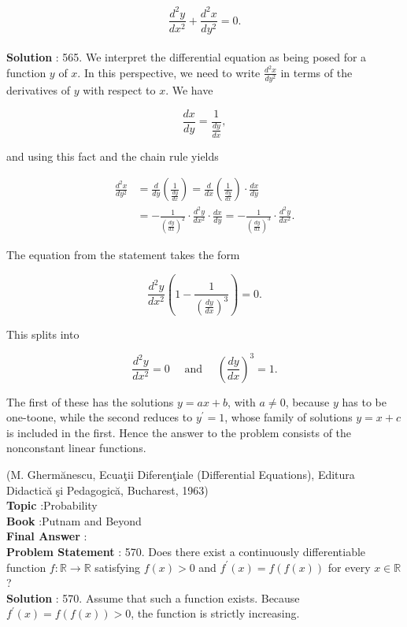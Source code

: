 \documentclass[10pt]{article}
\begin{document}
$$
\frac{d^{2} y}{d x^{2}}+\frac{d^{2} x}{d y^{2}}=0 .
$$
\\
\textbf{Solution} :
565. We interpret the differential equation as being posed for a function $y$ of $x$. In this perspective, we need to write $\frac{d^{2} x}{d y^{2}}$ in terms of the derivatives of $y$ with respect to $x$. We have

$$
\frac{d x}{d y}=\frac{1}{\frac{d y}{d x}},
$$

and using this fact and the chain rule yields

$$
\begin{aligned}
\frac{d^{2} x}{d y^{2}} &=\frac{d}{d y}\left(\frac{1}{\frac{d y}{d x}}\right)=\frac{d}{d x}\left(\frac{1}{\frac{d y}{d x}}\right) \cdot \frac{d x}{d y} \\
&=-\frac{1}{\left(\frac{d y}{d x}\right)^{2}} \cdot \frac{d^{2} y}{d x^{2}} \cdot \frac{d x}{d y}=-\frac{1}{\left(\frac{d y}{d x}\right)^{3}} \cdot \frac{d^{2} y}{d x^{2}} .
\end{aligned}
$$

The equation from the statement takes the form

$$
\frac{d^{2} y}{d x^{2}}\left(1-\frac{1}{\left(\frac{d y}{d x}\right)^{3}}\right)=0 .
$$

This splits into

$$
\frac{d^{2} y}{d x^{2}}=0 \quad \text { and } \quad\left(\frac{d y}{d x}\right)^{3}=1 .
$$

The first of these has the solutions $y=a x+b$, with $a \neq 0$, because $y$ has to be one-toone, while the second reduces to $y^{\prime}=1$, whose family of solutions $y=x+c$ is included in the first. Hence the answer to the problem consists of the nonconstant linear functions.

(M. Ghermănescu, Ecuaţii Diferenţiale (Differential Equations), Editura Didactică şi Pedagogică, Bucharest, 1963)
\\
\textbf{Topic} :Probability\\
\textbf{Book} :Putnam and Beyond\\
\textbf{Final Answer} :\\


\textbf{Problem Statement} :
570. Does there exist a continuously differentiable function $f: \mathbb{R} \rightarrow \mathbb{R}$ satisfying $f(x)>0$ and $f^{\prime}(x)=f(f(x))$ for every $x \in \mathbb{R}$ ? 
\\
\textbf{Solution} :
570. Assume that such a function exists. Because $f^{\prime}(x)=f(f(x))>0$, the function is strictly increasing.
\end{document}
